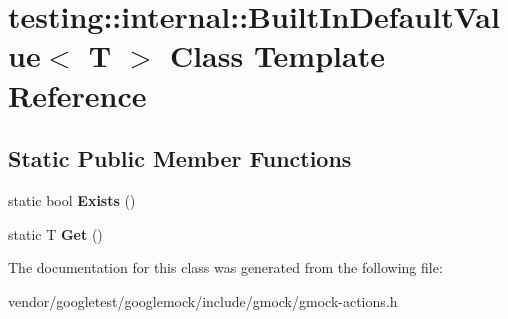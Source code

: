 \hypertarget{classtesting_1_1internal_1_1_built_in_default_value}{}\section{testing\+:\+:internal\+:\+:Built\+In\+Default\+Value$<$ T $>$ Class Template Reference}
\label{classtesting_1_1internal_1_1_built_in_default_value}
\subsection*{Static Public Member Functions}
\begin{DoxyCompactItemize}
\item 
\mbox{\label{classtesting_1_1internal_1_1_built_in_default_value_a35207bc20a493b0efb3980eb9a08dd2f}} 
static bool {\bfseries Exists} ()
\item 
\mbox{\label{classtesting_1_1internal_1_1_built_in_default_value_a7e26c1df14a887c8f393b29d6ea162e6}} 
static T {\bfseries Get} ()
\end{DoxyCompactItemize}


The documentation for this class was generated from the following file\+:\begin{DoxyCompactItemize}
\item 
vendor/googletest/googlemock/include/gmock/gmock-\/actions.\+h\end{DoxyCompactItemize}
